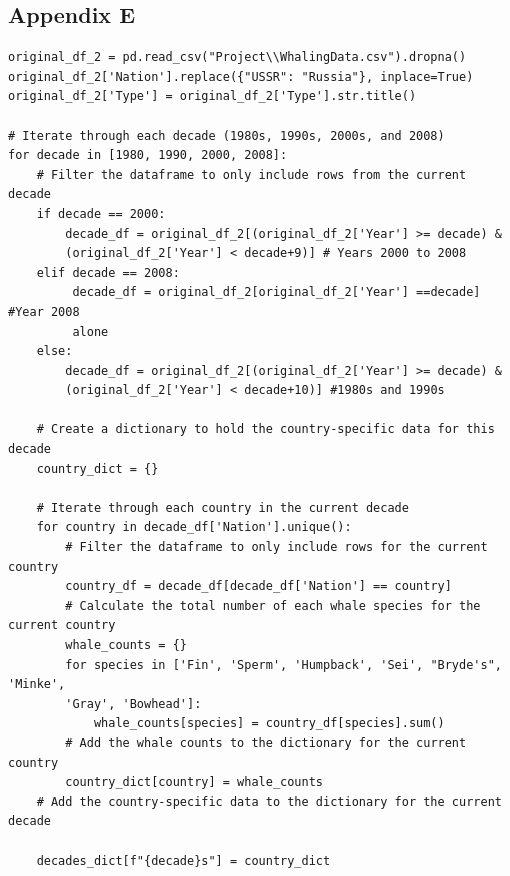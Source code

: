 \documentclass[12pt,a4paper]{article}
\begin{document}
\subsection{Appendix E}
\begin{verbatim}
original_df_2 = pd.read_csv("Project\\WhalingData.csv").dropna()
original_df_2['Nation'].replace({"USSR": "Russia"}, inplace=True)
original_df_2['Type'] = original_df_2['Type'].str.title()

# Iterate through each decade (1980s, 1990s, 2000s, and 2008)
for decade in [1980, 1990, 2000, 2008]:
    # Filter the dataframe to only include rows from the current decade
    if decade == 2000:
        decade_df = original_df_2[(original_df_2['Year'] >= decade) & 
        (original_df_2['Year'] < decade+9)] # Years 2000 to 2008
    elif decade == 2008:
         decade_df = original_df_2[original_df_2['Year'] ==decade] #Year 2008
         alone
    else:
        decade_df = original_df_2[(original_df_2['Year'] >= decade) & 
        (original_df_2['Year'] < decade+10)] #1980s and 1990s

    # Create a dictionary to hold the country-specific data for this decade
    country_dict = {}

    # Iterate through each country in the current decade
    for country in decade_df['Nation'].unique():
        # Filter the dataframe to only include rows for the current country
        country_df = decade_df[decade_df['Nation'] == country]
        # Calculate the total number of each whale species for the current country
        whale_counts = {}
        for species in ['Fin', 'Sperm', 'Humpback', 'Sei', "Bryde's", 'Minke',
        'Gray', 'Bowhead']:
            whale_counts[species] = country_df[species].sum()
        # Add the whale counts to the dictionary for the current country
        country_dict[country] = whale_counts
    # Add the country-specific data to the dictionary for the current decade

    decades_dict[f"{decade}s"] = country_dict
\end{verbatim}
\end{document}
